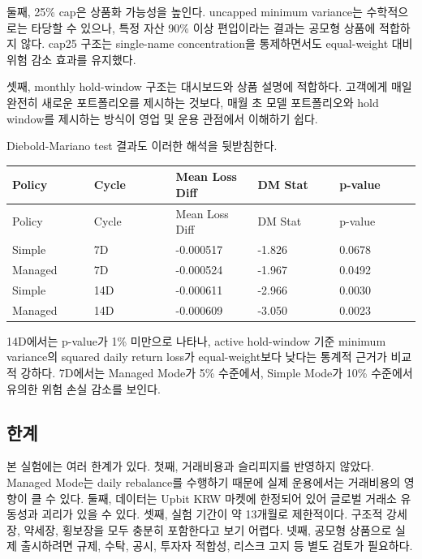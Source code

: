 \documentclass[12pt,a4paper]{article}
\begin{document}
둘째, 25\% cap은 상품화 가능성을 높인다. uncapped minimum variance는 수학적으로는 타당할 수 있으나, 특정 자산 90\% 이상 편입이라는 결과는 공모형 상품에 적합하지 않다. cap25 구조는 single-name concentration을 통제하면서도 equal-weight 대비 위험 감소 효과를 유지했다.

셋째, monthly hold-window 구조는 대시보드와 상품 설명에 적합하다. 고객에게 매일 완전히 새로운 포트폴리오를 제시하는 것보다, 매월 초 모델 포트폴리오와 hold window를 제시하는 방식이 영업 및 운용 관점에서 이해하기 쉽다.

Diebold-Mariano test 결과도 이러한 해석을 뒷받침한다.

\begin{center}
\scriptsize
\begin{longtable}{@{}p{0.20\linewidth}p{0.20\linewidth}p{0.20\linewidth}p{0.20\linewidth}p{0.20\linewidth}@{}}
\toprule
Policy & Cycle & Mean Loss Diff & DM Stat & p-value \\
\midrule
\endfirsthead
\toprule
Policy & Cycle & Mean Loss Diff & DM Stat & p-value \\
\midrule
\endhead
Simple & 7D & -0.000517 & -1.826 & 0.0678 \\
Managed & 7D & -0.000524 & -1.967 & 0.0492 \\
Simple & 14D & -0.000611 & -2.966 & 0.0030 \\
Managed & 14D & -0.000609 & -3.050 & 0.0023 \\
\bottomrule
\end{longtable}
\end{center}

14D에서는 p-value가 1\% 미만으로 나타나, active hold-window 기준 minimum variance의 squared daily return loss가 equal-weight보다 낮다는 통계적 근거가 비교적 강하다. 7D에서는 Managed Mode가 5\% 수준에서, Simple Mode가 10\% 수준에서 유의한 위험 손실 감소를 보인다.

\subsection{한계}

본 실험에는 여러 한계가 있다. 첫째, 거래비용과 슬리피지를 반영하지 않았다. Managed Mode는 daily rebalance를 수행하기 때문에 실제 운용에서는 거래비용의 영향이 클 수 있다. 둘째, 데이터는 Upbit KRW 마켓에 한정되어 있어 글로벌 거래소 유동성과 괴리가 있을 수 있다. 셋째, 실험 기간이 약 13개월로 제한적이다. 구조적 강세장, 약세장, 횡보장을 모두 충분히 포함한다고 보기 어렵다. 넷째, 공모형 상품으로 실제 출시하려면 규제, 수탁, 공시, 투자자 적합성, 리스크 고지 등 별도 검토가 필요하다.
\end{document}
